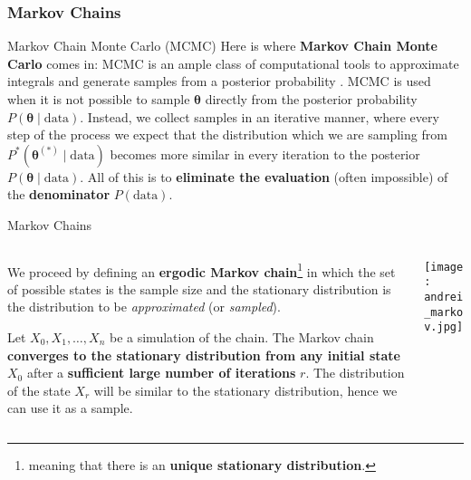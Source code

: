 \subsubsection{Markov Chains}
\begin{frame}{Markov Chain Monte Carlo (MCMC)}
	Here is where \textbf{Markov Chain Monte Carlo} comes in:
	\vfill
	MCMC is an ample class of computational tools to approximate integrals
	and generate samples from a posterior probability
	\parencite{brooksHandbookMarkovChain2011}.
	\vfill
	MCMC is used when it is not possible to sample $\boldsymbol{\theta}$
	directly from the posterior probability
	$P(\boldsymbol{\theta} \mid \text{data})$.
	Instead, we collect samples in an iterative manner,
	where every step of the process we expect that the distribution which we are sampling from
	$P^*(\boldsymbol{\theta}^{(*)} \mid \text{data})$
	becomes more similar in every iteration to the posterior
	$P(\boldsymbol{\theta} \mid \text{data})$.
	\vfill
	All of this is to \textbf{eliminate the evaluation}
	(often impossible) of the \textbf{denominator}
	$P(\text{data})$.
\end{frame}

\begin{frame}{Markov Chains}
	\begin{columns}
		\begin{column}{0.8\textwidth}
			\begin{vfilleditems}
				\item We proceed by defining an \textbf{ergodic Markov chain}\footnote{
					meaning that there is an \textbf{unique stationary distribution}.}
				in which the set of possible states is the sample size and
				the stationary distribution is the distribution to be \textit{approximated}
				(or \textit{sampled}).
				\item Let $X_0, X_1, \dots, X_n$ be a simulation of the chain.
				The Markov chain \textbf{converges to the stationary distribution from any initial state}
				$X_0$ after a \textbf{sufficient large number of iterations} $r$.
				The distribution of the state $X_r$ will be similar to the stationary distribution,
				hence we can use it as a sample.
			\end{vfilleditems}
		\end{column}
		\begin{column}{0.2\textwidth}
			\centering
			\texttt{[image: andrei\_markov.jpg]}
		\end{column}
	\end{columns}
\end{frame}

